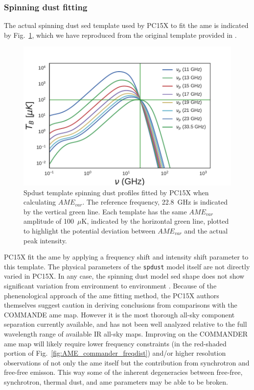         \subsubsection{Spinning dust fitting}
          The actual spinning dust \acrshort{sed} template used by PC15X to fit the \acrshort{ame} is indicated by Fig.~\ref{fig:AME_commander_freqshift_templ}, which we have reproduced from the original template provided in \cite{ali-haimoud09}.
              \begin{figure}
                \includegraphics[width=\textwidth]{../Plots/ch_datasources/AME_commander_freqshift_templ.pdf}
                \centering
                \caption{Spdust template spinning dust profiles fitted by PC15X when calculating $AME_{var}$.  The reference frequency, 22.8~GHz is indicated by the vertical green line. Each template has the same $AME_{var}$ amplitude of 100~$\mu$K, indicated by the horizontal green line, plotted to highlight the potential deviation between $AME_{var}$ and the actual peak intensity. }
                \label{fig:AME_commander_freqshift_templ}
              \end{figure}
          PC15X fit the \acrshort{ame} by applying a frequency shift and intensity shift parameter to this template. The physical parameters of the {\tt spdust} model itself are not directly varied in PC15X. In any case, the spinning dust model \acrshort{sed} shape does not show significant variation from environment to environment \citep{ali-haimoud09}.
         Because of the phenenological approach of the \acrshort{ame} fitting method, the PC15X authors themselves suggest caution in deriving conclusions from comparisons with the COMMANDE \acrshort{ame} map. However it is the most thorough all-sky component separation currently available, and has not been well analyzed relative to the full wavelength range of available IR all-sky maps. Improving on the COMMANDER \acrshort{ame} map will likely require lower frequency constraints (in the red-shaded portion of Fig.~\ref{fig:AME_commander_freqdist}) and/or higher resolution observations of not only the \acrshort{ame} itself but the contribution from synchrotron and free-free emisson. This way some of the inherent degeneracies between free-free, synchrotron, thermal dust, and \acrshort{ame} parameters may be able to be broken.
